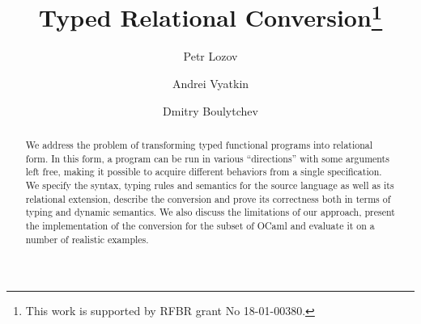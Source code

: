 \documentclass{llncs}
\begin{document}
\sloppy
\mainmatter

\title{Typed Relational Conversion\thanks{This work is supported by RFBR grant No 18-01-00380.}}

\author{
  Petr Lozov \and Andrei Vyatkin \and Dmitry Boulytchev
}


\maketitle

\begin{abstract}
We address the problem of transforming typed functional programs into relational form. 
In this form, a program can be run in various ``directions'' with some arguments left free, 
making it possible to acquire different behaviors from a single specification. We specify the 
syntax, typing rules and semantics for the source language as well as its relational extension, 
describe the conversion and prove its correctness both in terms of typing and dynamic semantics. 
We also discuss the limitations of our approach, present the implementation of the conversion for 
the subset of OCaml and evaluate it on a number of realistic examples.
\end{abstract}







\end{document}
